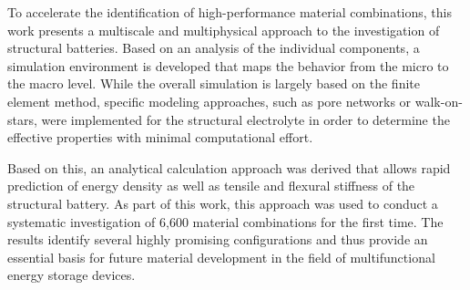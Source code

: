 To accelerate the identification of high-performance material combinations, this work presents a multiscale and multiphysical approach to the investigation of structural batteries. Based on an analysis of the individual components, a simulation environment is developed that maps the behavior from the micro to the macro level. While the overall simulation is largely based on the finite element method, specific modeling approaches, such as pore networks or walk-on-stars, were implemented for the structural electrolyte in order to determine the effective properties with minimal computational effort.

Based on this, an analytical calculation approach was derived that allows rapid prediction of energy density as well as tensile and flexural stiffness of the structural battery. As part of this work, this approach was used to conduct a systematic investigation of 6,600 material combinations for the first time. The results identify several highly promising configurations and thus provide an essential basis for future material development in the field of multifunctional energy storage devices.
\cleardoublepage
\hypersetup{pageanchor=true}